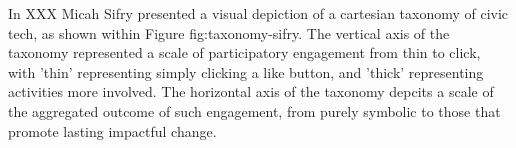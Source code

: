 In XXX Micah Sifry presented a visual depiction of a cartesian taxonomy of civic tech, as shown within Figure {fig:taxonomy-sifry}.
The vertical axis of the taxonomy represented a scale of participatory engagement from thin to click,
with 'thin' representing simply clicking a like button,
and 'thick' representing activities more involved.
The horizontal axis of the taxonomy depcits a scale of the aggregated outcome of such engagement, 
from purely symbolic to those that promote lasting impactful change.
